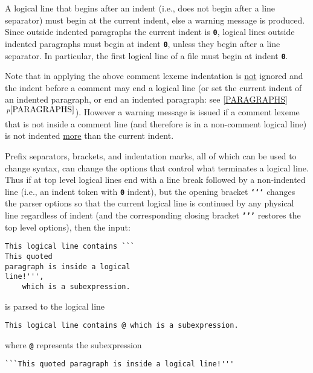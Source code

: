 \documentclass[12pt]{article}
\newcommand{\TT}[1]{{\tt \bfseries #1}}
\newcommand{\itemref}[1]{\ref{#1}$\,^{p\pageref{#1}}$}
\newenvironment{indpar}[1][0.3in]%
	{\begin{list}{}%
		     {\setlength{\itemsep}{0in}%
		      \setlength{\topsep}{0in}%
		      \setlength{\parsep}{1ex}%
		      \setlength{\labelwidth}{#1}%
		      \setlength{\leftmargin}{#1}%
		      \addtolength{\leftmargin}{\labelsep}}%
	 \item}%
	{\end{list}}
\begin{document}
A logical line that begins after an indent (i.e., does not begin
after a line separator) must begin at the current indent,
else a warning message is produced.
Since outside indented paragraphs the current indent is \TT{0},
logical lines outside indented paragraphs must begin at indent \TT{0},
unless they begin after a line separator.  In particular, the first
logical line of a file must begin at indent \TT{0}.

Note that in applying the above comment lexeme indentation
is \underline{not} ignored
and the indent before a comment may end a logical line (or set the
current indent of an indented paragraph, or end an indented paragraph:
see \itemref{PARAGRAPHS}).
However a warning message is issued if a comment lexeme that is not
inside a comment line (and therefore is in a non-comment logical line)
is not indented \underline{more} than the current indent.

Prefix separators, brackets, and indentation marks, all of which
can be used to change syntax, can change the options that control
what terminates a logical line.  Thus if at top level logical
lines end with a line break followed by a non-indented line
(i.e., an indent token with \TT{0} indent),
but the opening bracket \TT{`{}`{}`} changes the parser options so that
the current logical line is continued by any physical line regardless of
indent (and the corresponding closing bracket \TT{'{}'{}'} restores
the top level options), then the input:
\begin{indpar}\begin{verbatim}
This logical line contains ```
This quoted
paragraph is inside a logical
line!''',
    which is a subexpression.
\end{verbatim}\end{indpar}

is parsed to the logical line
\begin{indpar}\begin{verbatim}
This logical line contains @ which is a subexpression.
\end{verbatim}\end{indpar}

where \TT{@} represents the subexpression

\begin{indpar}\begin{verbatim}
```This quoted paragraph is inside a logical line!'''
\end{verbatim}\end{indpar}
\end{document}
